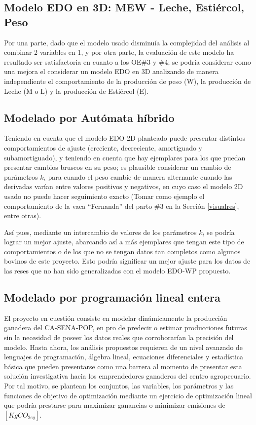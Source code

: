 \subsection{Modelo EDO en 3D: MEW - Leche, Estiércol, Peso}

Por una parte, dado que el modelo usado disminuía la complejidad del análisis al combinar 2 variables en 1, y por otra parte, la evaluación de este modelo ha resultado ser satisfactoria en cuanto a los OE\#3 y \#4; se podría considerar como una mejora el considerar un modelo EDO en 3D analizando de manera independiente el comportamiento de la producción de peso (W), la producción de Leche (M o L) y la producción de Estiércol (E).

\subsection{Modelado por Autómata híbrido}
Teniendo en cuenta que el modelo EDO 2D planteado puede presentar distintos comportamientos de ajuste (creciente, decreciente, amortiguado y subamortiguado), y teniendo en cuenta que hay ejemplares para los que puedan presentar cambios bruscos en su peso; es plausible considerar un cambio de parámetros $k_{i}$ para cuando el peso cambie de manera alternante cuando las derivadas varían entre valores positivos y negativos, en cuyo caso el modelo 2D usado no puede hacer seguimiento exacto (Tomar como ejemplo el comportamiento de la vaca ``Fernanda'' del parto \#3 en la Sección \ref{visualres}, entre otras).

Así pues, mediante un intercambio de valores de los parámetros $k_{i}$ se podría lograr un mejor ajuste, abarcando así a más ejemplares que tengan este tipo de comportamientos o de los que no se tengan datos tan completos como algunos bovinos de este proyecto. Esto podría significar un mejor ajuste para los datos de las reses que no han sido generalizadas con el modelo EDO-WP propuesto.


% 
\subsection{Modelado por programación lineal entera} \label{linprogmod}
El proyecto en cuestión consiste en modelar dinámicamente la producción ganadera del CA-SENA-POP, en pro de predecir o estimar producciones futuras sin la necesidad de poseer los datos reales que corroborarían la precisión del modelo. Hasta ahora, los análisis propuestos requieren de un nivel avanzado de lenguajes de programación, álgebra lineal, ecuaciones diferenciales y estadística básica que pueden presentarse como una barrera al momento de presentar esta solución investigativa hacia los emprendedores ganaderos del centro agropecuario. Por tal motivo, se plantean los conjuntos, las variables, los parámetros y las funciones de objetivo de optimización mediante un ejercicio de optimización lineal que podría prestarse para maximizar ganancias o minimizar emisiones de $[KgCO_{2eq}]$.

